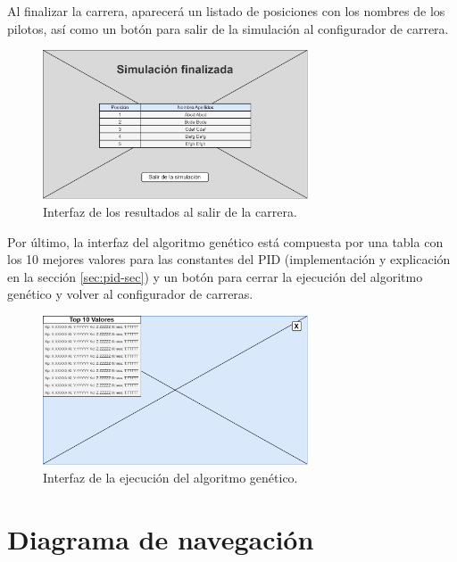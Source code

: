 Al finalizar la carrera, aparecerá un listado de posiciones con los nombres de los pilotos, así como un botón para salir de la simulación al configurador de carrera.

\begin{figure}[H]
    \centering
    \includegraphics[width=0.7\textwidth]{imagenes/pantallafinal.png}
    \caption{Interfaz de los resultados al salir de la carrera.}
    \label{fig:resultados-sim}
\end{figure}

Por último, la interfaz del algoritmo genético está compuesta por una tabla con los 10 mejores valores para las constantes del PID (implementación y explicación en la sección \ref{sec:pid-sec}) y un botón para cerrar la ejecución del algoritmo genético y volver al configurador de carreras.

\begin{figure}[H]
    \centering
    \includegraphics[width=0.7\textwidth]{imagenes/ga.png}
    \caption{Interfaz de la ejecución del algoritmo genético.}
\end{figure}

\section{Diagrama de navegación}


